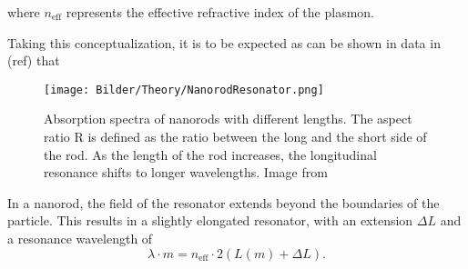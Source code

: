 where $n_{\mathrm{eff}}$ represents the effective refractive index of the plasmon.

Taking this conceptualization, it is to be expected as can be shown in data in (ref) that 

\begin{figure}
    \centering
    \texttt{[image: Bilder/Theory/NanorodResonator.png]}
    \caption{Absorption spectra of nanorods with different lengths. The aspect ratio R is defined as the ratio between the long and the short side of the rod. As the length of the rod increases, the longitudinal resonance shifts to longer wavelengths. Image from \cite{Link.1999}}
    \label{fig:NanorodResonator}
\end{figure}

In a nanorod, the field of the resonator extends beyond the boundaries of the particle. This results in a slightly elongated resonator, with an extension $\Delta L$ and a resonance wavelength of
\begin{equation}
    \lambda\cdot m = n_{\mathrm{eff}}\cdot 2(L(m)+\Delta L).
\end{equation}

